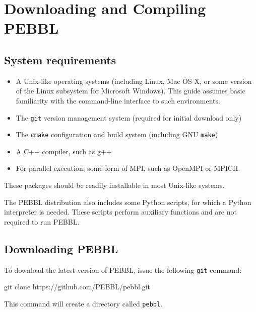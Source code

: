 \section{Downloading and Compiling PEBBL}
\label{sec:downloadcompile}

\subsection{System requirements}
\begin{itemize}
\item A Unix-like operating systems (including Linux, Mac OS X, or some
version of the Linux subsystem for Microsoft Windows).  This guide assumes
basic familiarity with the command-line interface to such environments.
\vspace{-1.8ex}
\item The \texttt{git} version management system (required for initial download only)
\vspace{-1.8ex}
\item The \texttt{cmake} configuration and build system (including GNU \texttt{make})
\vspace{-1.8ex}
\item A C++ compiler, such as g++
\vspace{-1.8ex}
\item For parallel execution, some form of MPI, such as OpenMPI or MPICH.
\end{itemize}
These packages should be readily installable in most Unix-like
systems.  

The PEBBL distribution also includes some Python scripts, for which a Python
interpreter is needed.  These scripts perform auxiliary functions and are not
required to run PEBBL.


\subsection{Downloading PEBBL}
To download the latest version of PEBBL, issue the following \texttt{git} command:
{\small
\begin{codeblock}
git clone https://github.com/PEBBL/pebbl.git
\end{codeblock}
}
\noindent This command will create a directory called
\texttt{pebbl}.  


